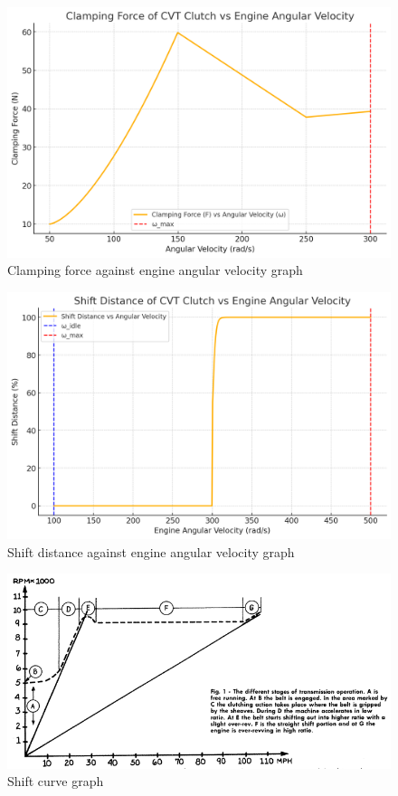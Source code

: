 \documentclass[12pt, titlepage]{article}
\begin{document}
\begin{figure}[H]
  \centering
  \includegraphics[width=\textwidth]{graphs/clamp_force.png}
  \caption{Clamping force against engine angular velocity graph}
  \label{fig:clamping_force_graph}
\end{figure}

\begin{figure}[H]
  \centering
  \includegraphics[width=\textwidth]{graphs/shift_vs_engine.png}
  \caption{Shift distance against engine angular velocity graph}
  \label{fig:shift_distance_graph}
\end{figure}

\begin{figure}[H]
  \centering
  \includegraphics[width=\textwidth]{graphs/shift_curve.png}
  \caption{Shift curve graph \citet{Aaen2007}}
  \label{fig:shift_curve}
\end{figure}
\end{document}
